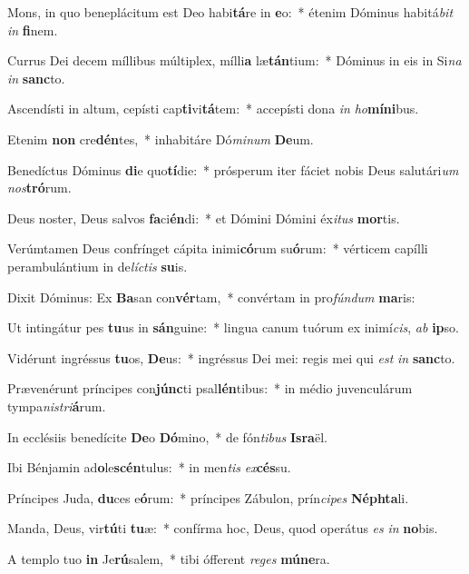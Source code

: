 \item Mons, in quo beneplácitum est Deo habi\textbf{tá}re in \textbf{e}o:~* étenim Dóminus habitá\textit{bit} \textit{in} \textbf{fi}nem.
\item Currus Dei decem míllibus múltiplex, mílli\textbf{a} læ\textbf{tán}tium:~* Dóminus in eis in Si\textit{na} \textit{in} \textbf{sanc}to.
\item Ascendísti in altum, cepísti cap\textbf{ti}vi\textbf{tá}tem:~* accepísti dona \textit{in} \textit{ho}\textbf{mí}\textbf{ni}bus.
\item Etenim \textbf{non} cre\textbf{dén}tes,~* inhabitáre Dó\textit{mi}\textit{num} \textbf{De}um.
\item Benedíctus Dóminus \textbf{di}e quo\textbf{tí}die:~* prósperum iter fáciet nobis Deus salutári\textit{um} \textit{nos}\textbf{tró}rum.
\item Deus noster, Deus salvos \textbf{fa}ci\textbf{én}di:~* et Dómini Dómini éx\textit{i}\textit{tus} \textbf{mor}tis.
\item Verúmtamen Deus confrínget cápita inimi\textbf{có}rum su\textbf{ó}rum:~* vérticem capílli perambulántium in de\textit{líc}\textit{tis} \textbf{su}is.
\item Dixit Dóminus: Ex \textbf{Ba}san con\textbf{vér}tam,~* convértam in pro\textit{fún}\textit{dum} \textbf{ma}ris:
\item Ut intingátur pes \textbf{tu}us in \textbf{sán}guine:~* lingua canum tuórum ex inimí\textit{cis}, \textit{ab} \textbf{ip}so.
\item Vidérunt ingréssus \textbf{tu}os, \textbf{De}us:~* ingréssus Dei mei: regis mei qui \textit{est} \textit{in} \textbf{sanc}to.
\item Prævenérunt príncipes con\textbf{júnc}ti psal\textbf{lén}tibus:~* in médio juvenculárum tympa\textit{nis}\textit{tri}\textbf{á}rum.
\item In ecclésiis benedícite \textbf{De}o \textbf{Dó}mino,~* de fón\textit{ti}\textit{bus} \textbf{Is}\textbf{ra}ël.
\item Ibi Bénjamin ad\textbf{o}le\textbf{scén}tulus:~* in men\textit{tis} \textit{ex}\textbf{cés}su.
\item Príncipes Juda, \textbf{du}ces e\textbf{ó}rum:~* príncipes Zábulon, prín\textit{ci}\textit{pes} \textbf{Néph}\textbf{ta}li.
\item Manda, Deus, vir\textbf{tú}ti \textbf{tu}æ:~* confírma hoc, Deus, quod operátus \textit{es} \textit{in} \textbf{no}bis.
\item A templo tuo \textbf{in} Je\textbf{rú}salem,~* tibi ófferent \textit{re}\textit{ges} \textbf{mú}\textbf{ne}ra.
